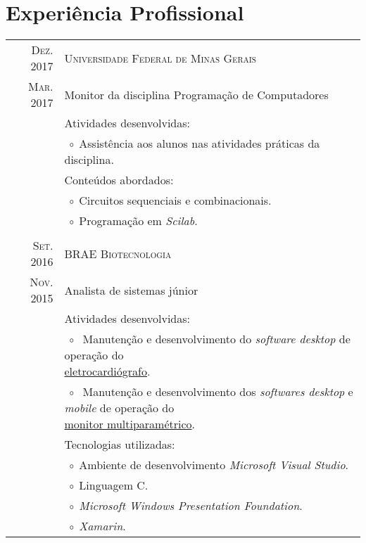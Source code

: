 \documentclass[a4paper,10pt]{article}
\newcommand{\tabitem}{$\;\circ\;$}
\renewcommand\#{\protect\scalebox{0.8}{\protect\raisebox{0.4ex}{\char"0023}}}
\begin{document}
\section{Experiência Profissional}
\begin{tabular}{r|p{12.3cm}}
  \textsc{Dez. 2017} & \textsc{Universidade Federal de Minas Gerais} \\
  \textsc{Mar. 2017} & Monitor da disciplina Programação de Computadores \\[5pt]
  & Atividades desenvolvidas: \\
  & \tabitem Assistência aos alunos nas atividades práticas da disciplina. \\
  & Conteúdos abordados: \\
  & \tabitem Circuitos sequenciais e combinacionais. \\
  & \tabitem Programação em \textit{Scilab}. \\
  
  \multicolumn{2}{c}{} \\
  \textsc{Set. 2016} & \textsc{BRAE Biotecnologia} \\
  \textsc{Nov. 2015} & Analista de sistemas júnior \\[5pt]
  & Atividades desenvolvidas: \\
  & \tabitem \makecell[lt] {
              Manutenção e desenvolvimento do \textit{software desktop} de operação do \\
              \href{http://www.ferox.vet.br/pt-br/produtos/ecg-veterinario.aspx}{eletrocardiógrafo}.
             }\\
  & \tabitem \makecell[lt]{
              Manutenção e desenvolvimento dos \textit{softwares desktop} e \textit{mobile} de operação do \\
              \href{http://www.ferox.com.br/pt-br/produtos/monitor-multiparametrico/monitorfx4000.aspx}{monitor multiparamétrico}.
             }\\[-3pt]
  & Tecnologias utilizadas: \\
  & \tabitem Ambiente de desenvolvimento \textit{Microsoft Visual Studio}. \\
  & \tabitem Linguagem C\#. \\
  & \tabitem \textit{Microsoft Windows Presentation Foundation}. \\
  & \tabitem \textit{Xamarin}. \\
  

\end{tabular}
\end{document}
